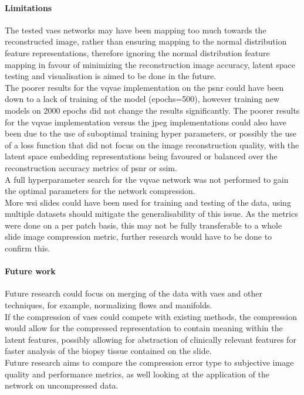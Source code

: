 \documentclass[review]{elsarticle}
\begin{document}
\paragraph{Limitations} The tested \glspl{vae} networks may have been mapping too much towards the reconstructed image, rather than ensuring mapping to the normal distribution feature representations, therefore ignoring the normal distribution feature mapping in favour of minimizing the reconstruction image accuracy, latent space testing and visualisation is aimed to be done in the future. \\
The poorer results for the \gls{vqvae} implementation on the \gls{psnr} could have been down to a lack of training of the model (epochs=500), however training new models on 2000 epochs did not change the results significantly. The poorer results for the \gls{vqvae} implementation versus the \gls{jpeg} implementations could also have been due to the use of suboptimal training hyper parameters, or possibly the use of a loss function that did not focus on the image reconstruction quality, with the latent space embedding representations being favoured or balanced over the reconstruction accuracy metrics of \gls{psnr} or \gls{ssim}. \\
A full hyperparameter search for the \gls{vqvae} network was not performed to gain the optimal parameters for the network compression. \\
More \gls{wsi} slides could have been used for training and testing of the data, using multiple datasets should mitigate the generalisability of this issue. As the metrics were done on a per patch basis, this may not be fully transferable to a whole slide image compression metric, further research would have to be done to confirm this.

\paragraph{Future work} Future research could focus on merging of the data with \glspl{vae} and other techniques, for example, normalizing flows and manifolds. \\
If the compression of \glspl{vae} could compete with existing methods, the compression would allow for the compressed representation to contain meaning within the latent features, possibly allowing for abstraction of clinically relevant features for faster analysis of the biopsy tissue contained on the slide. \\
Future research aims to compare the compression error type to subjective image quality and performance metrics, as well looking at the application of the network on uncompressed data. \\
\end{document}
